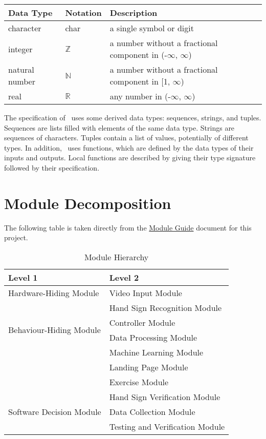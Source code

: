 \documentclass[12pt, titlepage]{article}
\begin{document}
\begin{center}
\renewcommand{\arraystretch}{1.2}
\noindent 
\begin{tabular}{l l p{7.5cm}} 
\toprule 
\textbf{Data Type} & \textbf{Notation} & \textbf{Description}\\ 
\midrule
character & char & a single symbol or digit\\
integer & $\mathbb{Z}$ & a number without a fractional component in (-$\infty$, $\infty$) \\
natural number & $\mathbb{N}$ & a number without a fractional component in [1, $\infty$) \\
real & $\mathbb{R}$ & any number in (-$\infty$, $\infty$)\\
\bottomrule
\end{tabular} 
\end{center}

\noindent
The specification of \progname \ uses some derived data types: sequences, strings, and
tuples. Sequences are lists filled with elements of the same data type. Strings
are sequences of characters. Tuples contain a list of values, potentially of
different types. In addition, \progname \ uses functions, which
are defined by the data types of their inputs and outputs. Local functions are
described by giving their type signature followed by their specification.

\section{Module Decomposition}

The following table is taken directly from the \href{https://github.com/stanreee/sign-language-learning/blob/DesignDocRev0/docs/Design/SoftArchitecture/MG.pdf}{Module Guide} document for this project.

\begin{table}[h!]
\centering
\begin{tabular}{p{} p{}}
\toprule
\textbf{Level 1} & \textbf{Level 2}\\
\midrule

\multirow{1}{0.3\textwidth}{Hardware-Hiding Module} 
& Video Input Module\\
\midrule

\multirow{4}{0.3\textwidth}{Behaviour-Hiding Module} 
& Hand Sign Recognition Module\\
& Controller Module \\
& Data Processing Module \\
& Machine Learning Module \\
& Landing Page Module \\
& Exercise Module \\
\midrule

\multirow{3}{0.3\textwidth}{Software Decision Module} 
& Hand Sign Verification Module \\
& Data Collection Module \\
& Testing and Verification Module \\
\bottomrule

\end{tabular}
\caption{Module Hierarchy}
\label{TblMH}
\end{table}
\end{document}
